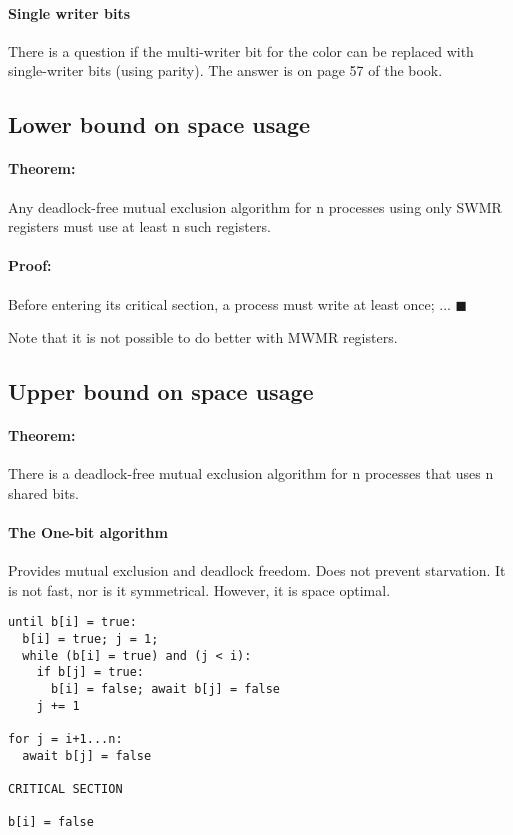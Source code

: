 \documentclass{idc_msc}
\begin{document}
\paragraph{Single writer bits}
There is a question if the multi-writer bit for the color can be replaced with single-writer bits (using parity).
The answer is on page 57 of the book.

\clearpage
\subsection{Lower bound on space usage}

\paragraph{Theorem:}
Any deadlock-free mutual exclusion algorithm for n processes using only SWMR registers must use at least n such registers.

\paragraph{Proof:}
Before entering its critical section, a process must write at least once; ... $\blacksquare$

Note that it is not possible to do better with MWMR registers.

\subsection{Upper bound on space usage}

\paragraph{Theorem:}
There is a deadlock-free mutual exclusion algorithm for n processes that uses n shared bits.

\paragraph{The One-bit algorithm}

Provides mutual exclusion and deadlock freedom.
Does not prevent starvation.
It is not fast, nor is it symmetrical.
However, it is space optimal.

\begin{lstlisting}[frame=L,mathescape=true,title={For processes $i=1...n$}]
until b[i] = true:
  b[i] = true; j = 1;
  while (b[i] = true) and (j < i):
    if b[j] = true:
      b[i] = false; await b[j] = false
    j += 1

for j = i+1...n:
  await b[j] = false

CRITICAL SECTION

b[i] = false
\end{lstlisting}
\end{document}
